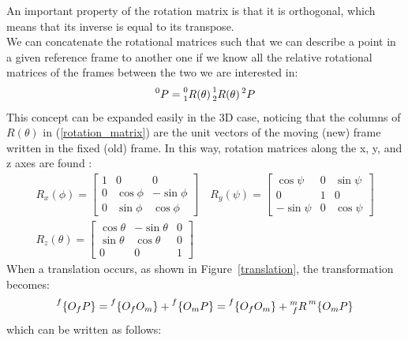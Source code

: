 \documentclass[a4paper,12pt,oneside]{report}
\begin{document}
An important property of the rotation matrix is that it is orthogonal, which means that its inverse is equal to its transpose.\\
We can concatenate the rotational matrices such that we can describe a point in a given reference frame to another one if we know all the relative rotational matrices of the frames between the two we are interested in:
\begin{equation}
  \prescript{0}{}{P}=\prescript{0}{1}{R(\theta)}\prescript{1}{2}{R(\theta)}\prescript{2}{}{P}
  \label{concatenate}
\end{equation}
This concept can be expanded easily in the 3D case, noticing that the columns of $R(\theta)$ in (\ref{rotation_matrix}) are the unit vectors of the moving (new) frame written in the fixed (old) frame. In this way, rotation matrices along the x, y, and z axes are found \cite{six}:
\begin{equation}
  \begin{array}{c}
  R_x(\phi)=\begin{bmatrix}
    1&0&0\\
    0&\cos{\phi}&-\sin{\phi}\\
    0&\sin{\phi}&\cos{\phi}
  \end{bmatrix} \quad R_y(\psi)=\begin{bmatrix}
    \cos{\psi}&0&\sin{\psi}\\
    0&1&0\\
    -\sin{\psi}&0&\cos{\psi}
  \end{bmatrix} \\
  R_z(\theta)=\begin{bmatrix}
    \cos{\theta}&-\sin{\theta}&0\\
    \sin{\theta}&\cos{\theta}&0\\
    0&0&1
  \end{bmatrix} 
\end{array}
\label{rotation_matrices}
\end{equation}
When a translation occurs, as shown in Figure~\ref{translation}, the transformation becomes:
\begin{equation}
  \prescript{f}{}{\{O_fP\}}=\prescript{f}{}{\{O_fO_m\}}+\prescript{f}{}{\{O_mP\}}=\prescript{f}{}{\{O_fO_m\}}+\prescript{m}{f}{R}\prescript{m}{}{\{O_mP\}}
\end{equation}
which can be written as follows:
\end{document}
